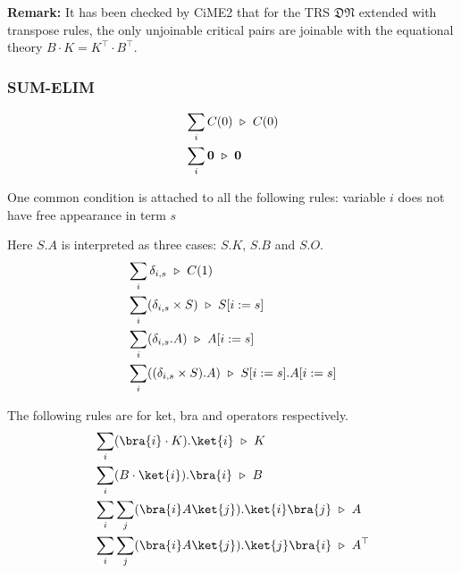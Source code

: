 \textbf{Remark:} It has been checked by CiME2 that for the TRS $\mathfrak{DN}$ extended with transpose rules, the only unjoinable critical pairs are joinable with the equational theory $B\cdot K = K^\top \cdot B^\top$.


\subsubsection*{\textsf{SUM-ELIM}}

\begin{align*}
  & \sum_i C(0) \ \triangleright\  C(0) \\
  & \sum_i \mathbf{0} \ \triangleright\  \mathbf{0}
\end{align*}

One common condition is attached to all the following rules: variable $i$ does not have free appearance in term $s$

Here $S.A$ is interpreted as three cases: $S.K$, $S.B$ and $S.O$.
\begin{align*}
  & \sum_i \delta_{i, s} \ \triangleright\  C(1) \\
  & \sum_i (\delta_{i, s} \times S) \ \triangleright\  S[i:=s] \\
  & \sum_i (\delta_{i, s}.A) \ \triangleright\  A[i:=s] \\
  & \sum_i ((\delta_{i, s} \times S).A) \ \triangleright\  S[i:=s].A[i:=s] \\
\end{align*}




The following rules are for ket, bra and operators respectively.
\begin{align*}
  & \sum_i (\bra{i} \cdot K).\ket{i} \reduce K \\
  & \sum_i (B \cdot \ket{i}).\bra{i} \reduce B \\
  & \sum_i \sum_j (\bra{i} A \ket{j}).\ket{i}\bra{j} \reduce A \\
  & \sum_i \sum_j (\bra{i} A \ket{j}).\ket{j}\bra{i} \reduce A^\top
\end{align*}


